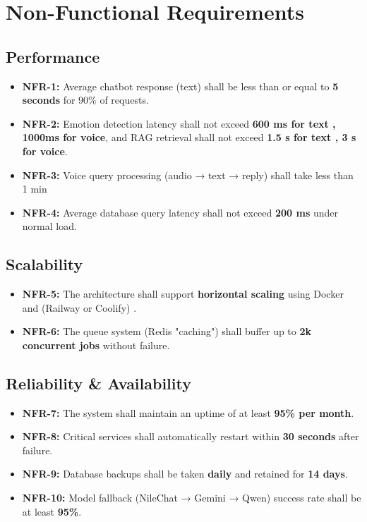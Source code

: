 \documentclass[12pt,a4paper]{article}
\begin{document}
\section{Non-Functional Requirements}

\subsection{Performance}

\begin{itemize}[leftmargin=2cm]
    \item \textbf{NFR-1:} Average chatbot response (text) shall be less than or equal to \textbf{5 seconds} for 90\% of requests.
    \item \textbf{NFR-2:} Emotion detection latency shall not exceed \textbf{600 ms for text , 1000ms for voice}, and RAG retrieval shall not exceed \textbf{1.5 s for text , 3 s for voice}.
    \item \textbf{NFR-3:} Voice query processing (audio → text → reply) shall take less than 1 min
    \item \textbf{NFR-4:} Average database query latency shall not exceed \textbf{200 ms} under normal load.
\end{itemize}

\subsection{Scalability}

\begin{itemize}[leftmargin=2cm]
    \item \textbf{NFR-5:} The architecture shall support \textbf{horizontal scaling} using Docker and (Railway or Coolify) .
    \item \textbf{NFR-6:} The queue system (Redis "caching") shall buffer up to \textbf{2k concurrent jobs} without failure.
\end{itemize}

\subsection{ Reliability \& Availability}

\begin{itemize}[leftmargin=2cm]
    \item \textbf{NFR-7:} The system shall maintain an uptime of at least \textbf{95\% per month}.
    \item \textbf{NFR-8:} Critical services shall automatically restart within \textbf{30 seconds} after failure.
    \item \textbf{NFR-9:} Database backups shall be taken \textbf{daily} and retained for \textbf{14 days}.
    \item \textbf{NFR-10:} Model fallback (NileChat → Gemini → Qwen) success rate shall be at least \textbf{95\%}.
\end{itemize}
\end{document}
